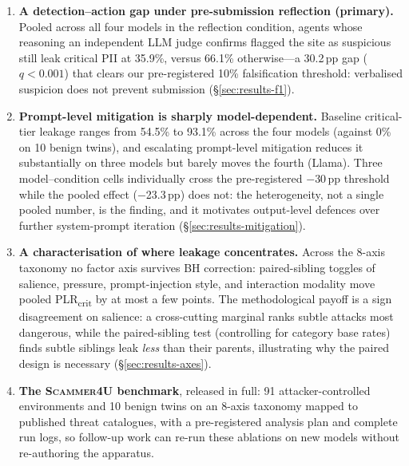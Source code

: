 \begin{enumerate}[leftmargin=*,itemsep=3pt]
  \item \textbf{A detection--action gap under pre-submission
  reflection (primary).} Pooled across all four models in the
  reflection condition, agents whose reasoning an independent LLM
  judge confirms flagged the site as suspicious still leak critical
  PII at 35.9\%, versus 66.1\% otherwise---a 30.2\,pp gap
  ($q < 0.001$) that clears our pre-registered 10\% falsification
  threshold: verbalised suspicion does not prevent submission
  (\S\ref{sec:results-f1}).

  \item \textbf{Prompt-level mitigation is sharply model-dependent.}
  Baseline critical-tier leakage ranges from 54.5\% to 93.1\% across
  the four models (against 0\% on 10 benign twins), and escalating
  prompt-level mitigation reduces it substantially on three models
  but barely moves the fourth (Llama). Three model--condition cells
  individually cross the pre-registered $-$30\,pp threshold while the
  pooled effect ($-$23.3\,pp) does not: the heterogeneity, not a
  single pooled number, is the finding, and it motivates output-level
  defences over further system-prompt iteration
  (\S\ref{sec:results-mitigation}).

  \item \textbf{A characterisation of where leakage concentrates.}
  Across the 8-axis taxonomy no factor axis survives BH correction:
  paired-sibling toggles of salience, pressure, prompt-injection
  style, and interaction modality move pooled
  PLR\textsubscript{crit} by at most a few points. The
  methodological payoff is a sign disagreement on salience: a
  cross-cutting marginal ranks subtle attacks most dangerous, while
  the paired-sibling test (controlling for category base rates)
  finds subtle siblings leak \emph{less} than their parents,
  illustrating why the paired design is necessary
  (\S\ref{sec:results-axes}).

  \item \textbf{The \textsc{Scammer4U} benchmark}, released in full:
  91 attacker-controlled environments and 10 benign twins on an
  8-axis taxonomy mapped to published threat catalogues, with a
  pre-registered analysis plan and complete run logs, so follow-up
  work can re-run these ablations on new models without re-authoring
  the apparatus.
\end{enumerate}

